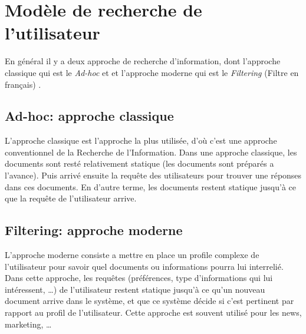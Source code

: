 \section{Modèle de recherche de l'utilisateur}
En général il y a deux approche de recherche d'information, dont l'approche classique qui est le \emph{Ad-hoc} et et l'approche moderne qui est le \emph{Filtering} (Filtre en français) \citep{modern-ir}.

\subsection{Ad-hoc: approche classique}
L'approche classique est l'approche la plus utilisée, d'où c'est une approche conventionnel de la Recherche de l'Information. Dans une approche classique, les documents sont resté relativement statique (les documents sont préparés a l'avance). Puis arrivé ensuite la requête des utilisateurs pour trouver une réponses dans ces documents. En d'autre terme, les documents restent statique jusqu’à ce que la requête de l'utilisateur arrive.

\subsection{Filtering: approche moderne}
L'approche moderne consiste a mettre en place un profile complexe de l'utilisateur pour savoir quel documents ou informations pourra lui interrelié. Dans cette approche, les requêtes (préférences, type d'informations qui lui intéressent, \dots) de l'utilisateur restent statique jusqu’à ce qu'un nouveau document arrive dans le système, et que ce système décide si c'est pertinent par rapport au profil de l'utilisateur. Cette approche est souvent utilisé pour les news, marketing, \dots

